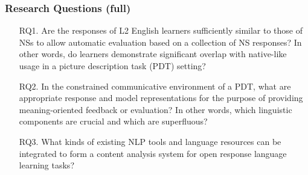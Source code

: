 \documentclass[handout,xcolor={dvipsnames}]{beamer}
\begin{document}
\begin{frame}
\frametitle{Research Questions (full)}
\small
\begin{itemize}
\pause
\vspace{2em}
\item[RQ1.]{Are the responses of L2 English learners sufficiently similar to those of NSs to allow automatic evaluation based on a collection of NS responses? In other words, do learners demonstrate significant overlap with native-like usage in a picture description task (PDT) setting?} %
\vspace{2em}
\pause
\item[RQ2.]{In the constrained communicative environment of a PDT, what are appropriate response and model representations for the purpose of providing meaning-oriented feedback or evaluation? In other words, which linguistic components are crucial and which are superfluous?}

\pause
\vspace{2em}
\item[RQ3.]{What kinds of existing NLP tools and language resources can be integrated to form a content analysis system for open response language learning tasks?}
\end{itemize}
\end{frame}
\end{document}
